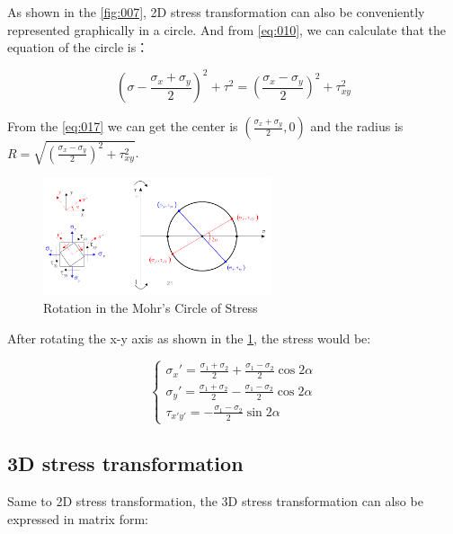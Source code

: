 \documentclass[en,hazy,cyan,8pt,normal]{elegantnote}
\begin{document}
    As shown in the \cref{fig:007}, 2D stress transformation can also be conveniently represented graphically in a circle. And from \cref{eq:010}, we can calculate that the equation of the circle is：

    \begin{equation}\label{eq:017}
      \left( \sigma - \frac{\sigma_x + \sigma_y}{2} \right)^2 + \tau^2 = \left( \frac{\sigma_x - \sigma_y}{2} \right)^2 + \tau_{xy}^2
    \end{equation}

    From the \cref{eq:017} we can get the center is $\displaystyle \left(\frac{\sigma_x + \sigma_y}{2}, 0\right)$ and the radius is $\displaystyle R=\sqrt{\left( \frac{\sigma_x - \sigma_y}{2} \right)^2 + \tau_{xy}^2}$.

    \begin{figure}[H]
      \centering
      \includegraphics[width=0.6\textwidth]{image/008.png}
      \caption{Rotation in the Mohr's Circle of Stress}
      \label{fig:008}
    \end{figure}

    After rotating the x-y axis as shown in the \cref{fig:008}, the stress would be:

    \begin{equation}\label{eq:018}
      \begin{cases}
        \displaystyle \sigma_x'=\frac{\sigma_1+\sigma_2}{2}+\frac{\sigma_1-\sigma_2}{2}\cos2\alpha\\
        \displaystyle \sigma_y'=\frac{\sigma_1+\sigma_2}{2}-\frac{\sigma_1-\sigma_2}{2}\cos2\alpha\\
        \displaystyle \tau_{x'y'}=-\frac{\sigma_1-\sigma_2}{2}\sin2\alpha
      \end{cases}
    \end{equation}
  
  \subsection{3D stress transformation}
    Same to 2D stress transformation, the 3D stress transformation can also be expressed in matrix form:
\end{document}
